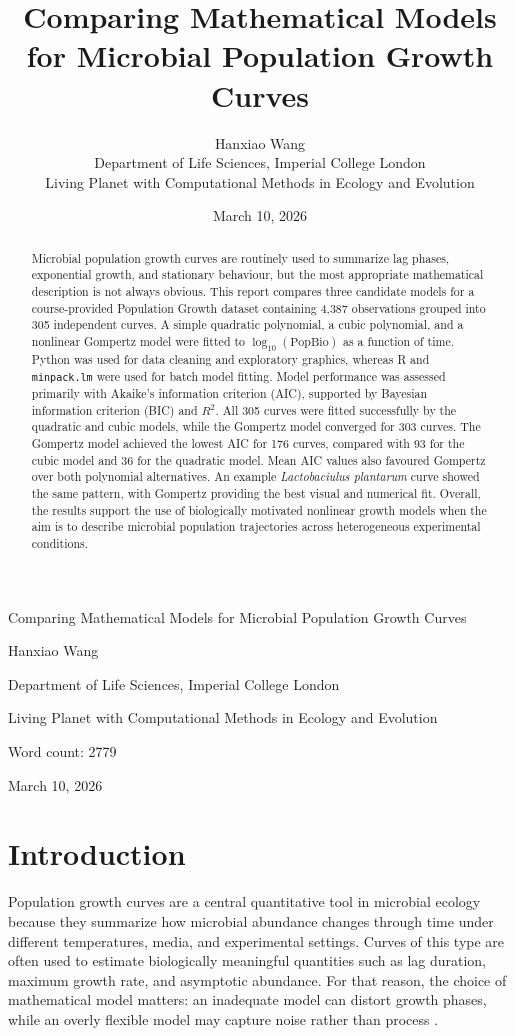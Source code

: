 \documentclass[11pt]{article}
\title{Comparing Mathematical Models for Microbial Population Growth Curves}
\author{Hanxiao Wang \\ Department of Life Sciences, Imperial College London \\ Living Planet with Computational Methods in Ecology and Evolution}
\date{March 10, 2026}
\begin{document}
\begin{titlepage}
    \centering
    {\Large Comparing Mathematical Models for Microbial Population Growth Curves\par}
    \vspace{1cm}
    {\large Hanxiao Wang\par}
    {\large Department of Life Sciences, Imperial College London\par}
    {\large Living Planet with Computational Methods in Ecology and Evolution\par}
    \vfill
    {\large Word count: 2779\par}
    \vspace{1cm}
    {\large March 10, 2026\par}
\end{titlepage}
\clearpage
{}

\begin{abstract}
Microbial population growth curves are routinely used to summarize lag phases, exponential growth, and stationary behaviour, but the most appropriate mathematical description is not always obvious. This report compares three candidate models for a course-provided Population Growth dataset containing 4,387 observations grouped into 305 independent curves. A simple quadratic polynomial, a cubic polynomial, and a nonlinear Gompertz model were fitted to $\log_{10}(\mathrm{PopBio})$ as a function of time. Python was used for data cleaning and exploratory graphics, whereas R and \texttt{minpack.lm} were used for batch model fitting. Model performance was assessed primarily with Akaike's information criterion (AIC), supported by Bayesian information criterion (BIC) and $R^2$. All 305 curves were fitted successfully by the quadratic and cubic models, while the Gompertz model converged for 303 curves. The Gompertz model achieved the lowest AIC for 176 curves, compared with 93 for the cubic model and 36 for the quadratic model. Mean AIC values also favoured Gompertz over both polynomial alternatives. An example \textit{Lactobaciulus plantarum} curve showed the same pattern, with Gompertz providing the best visual and numerical fit. Overall, the results support the use of biologically motivated nonlinear growth models when the aim is to describe microbial population trajectories across heterogeneous experimental conditions.
\end{abstract}

\section{Introduction}
Population growth curves are a central quantitative tool in microbial ecology because they summarize how microbial abundance changes through time under different temperatures, media, and experimental settings. Curves of this type are often used to estimate biologically meaningful quantities such as lag duration, maximum growth rate, and asymptotic abundance. For that reason, the choice of mathematical model matters: an inadequate model can distort growth phases, while an overly flexible model may capture noise rather than process \citep{Zwietering1990,Baranyi1994}.
\end{document}
